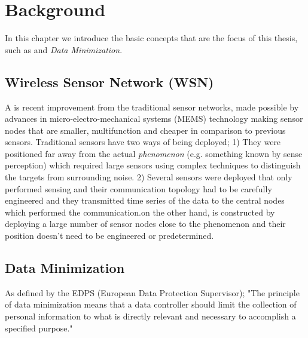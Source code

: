 \chapter{Background}

In this chapter we introduce the basic concepts that are the focus of this thesis, such as \wsn and \textit{Data Minimization}. %


\section{Wireless Sensor Network (WSN)}



A \wsn is recent improvement from the traditional sensor networks, made possible by advances in micro-electro-mechanical systems (MEMS) technology making sensor nodes that are smaller, multifunction and cheaper in comparison to previous sensors. Traditional sensors have two ways of being deployed; 1) They were positioned far away from the actual \textit{phenomenon} (e.g. something known by sense perception) which required large sensors using complex techniques to distinguish the targets from surrounding noise. 2) Several sensors were deployed that only performed sensing and their communication topology had to be carefully engineered and they transmitted time series of the data to the central nodes which performed the communication.\wsns on the other hand, is constructed by deploying a large number of sensor nodes close to the phenomenon and their position doesn't need to be engineered or predetermined.\cite{WSNsurvey} 


\section{Data Minimization}


As defined by the EDPS (European Data Protection Supervisor); "The principle of data minimization means that a data controller should limit the collection of personal information to what is directly relevant and necessary to accomplish a specified purpose." \cite{website:europa.eu} %

